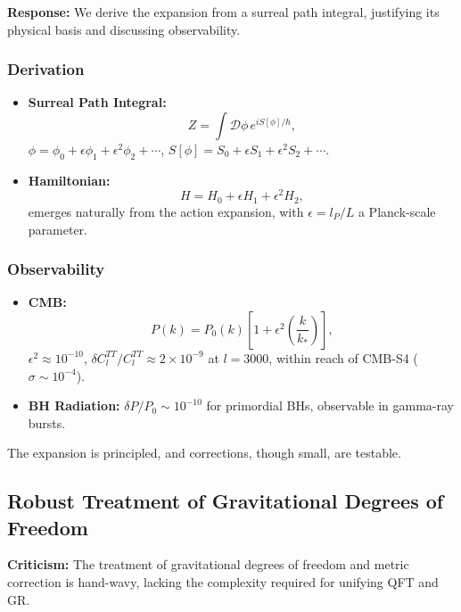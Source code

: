\documentclass{article}
\begin{document}
\textbf{Response:}  
We derive the expansion from a surreal path integral, justifying its physical basis and discussing observability.

\subsubsection{Derivation}
\begin{itemize}
    \item \textbf{Surreal Path Integral:}
    \begin{equation}
    Z = \int \mathcal{D}\phi \, e^{i S[\phi] / \hbar},
    \end{equation}
    \(\phi = \phi_0 + \epsilon \phi_1 + \epsilon^2 \phi_2 + \cdots\), \(S[\phi] = S_0 + \epsilon S_1 + \epsilon^2 S_2 + \cdots\).
    \item \textbf{Hamiltonian:} 
    \begin{equation}
    H = H_0 + \epsilon H_1 + \epsilon^2 H_2,
    \end{equation}
    emerges naturally from the action expansion, with \(\epsilon = l_P / L\) a Planck-scale parameter.
\end{itemize}

\subsubsection{Observability}
\begin{itemize}
    \item \textbf{CMB:} 
    \begin{equation}
    P(k) = P_0(k) \left[ 1 + \epsilon^2 \left( \frac{k}{k_*} \right) \right],
    \end{equation}
    \(\epsilon^2 \approx 10^{-10}\), \(\delta C_l^{TT} / C_l^{TT} \approx 2 \times 10^{-9}\) at \(l = 3000\), within reach of CMB-S4 (\(\sigma \sim 10^{-4}\)).
    \item \textbf{BH Radiation:} \(\delta P / P_0 \sim 10^{-10}\) for primordial BHs, observable in gamma-ray bursts.
\end{itemize}
The expansion is principled, and corrections, though small, are testable.

\subsection{Robust Treatment of Gravitational Degrees of Freedom}
\textbf{Criticism:} The treatment of gravitational degrees of freedom and metric correction is hand-wavy, lacking the complexity required for unifying QFT and GR.
\end{document}

